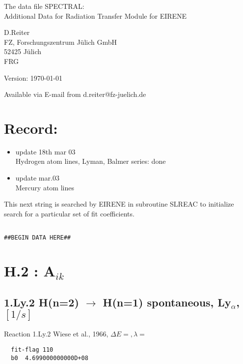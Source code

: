 \documentclass[12pt]{article}
\begin{document}
\parindent 0pt
{\LARGE \bf \center
\vspace*{3truecm}

The data file SPECTRAL: \\
Additional Data for Radiation Transfer Module for EIRENE
\vspace*{3truecm}

D.Reiter \\
FZ, Forschungszentrum J\"ulich GmbH \\
52425 J\"ulich \\
FRG
\vspace{5truecm}

Version: \today
\vspace{3truecm}

Available via E-mail from d.reiter@fz-juelich.de
}
\tableofcontents
\newpage

\section{Record:}
\begin{itemize}
\item update  18th mar 03  \\
Hydrogen atom lines, Lyman, Balmer series: done\\
\item update  mar.03 \\
Mercury atom lines\\
\end{itemize}
\newpage

This next string is searched by EIRENE in subroutine SLREAC
to initialize search for a particular set of fit coefficients.

\bigskip

\begin{small}\begin{verbatim}

##BEGIN DATA HERE##

\end{verbatim}\end{small}

\newpage

\section{H.2 :  A$_{ik}$}


\subsection{
1.Ly.2   H(n=2) $\rightarrow$ H(n=1) spontaneous,  Ly$_\alpha$, $[1/s]$
}
Reaction 1.Ly.2
Wiese et al., 1966, $\Delta E=     ,\lambda=  $
\begin{small}\begin{verbatim}
  fit-flag 110
  b0  4.699000000000D+08
\end{verbatim}\end{small}
\end{document}
